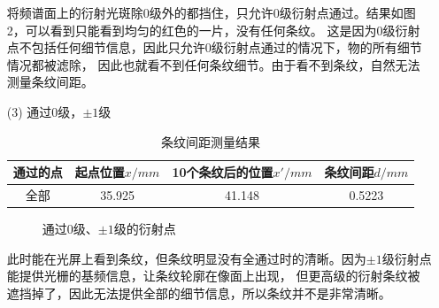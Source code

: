 \documentclass{article}
\begin{document}
\begin{enumerate}
        将频谱面上的衍射光斑除0级外的都挡住，只允许0级衍射点通过。结果如图2，可以看到只能看到均匀的红色的一片，没有任何条纹。
        这是因为0级衍射点不包括任何细节信息，因此只允许0级衍射点通过的情况下，物的所有细节情况都被滤除，
        因此也就看不到任何条纹细节。由于看不到条纹，自然无法测量条纹间距。

        \item [(3)] 通过0级，$\pm 1$级 \\
        \begin{table}[htb]
            \centering
            \begin{tabular}{|c|c|c|c|}
                \hline
                通过的点 & 起点位置$x/mm$ & 10个条纹后的位置$x'/mm$ & 条纹间距$d/mm$ \\
                \hline
                全部 & 35.925 & 41.148 & 0.5223 \\
                \hline
            \end{tabular}
            \caption{条纹间距测量结果}
        \end{table}
        \begin{figure}[htb]
            \centering
            \caption{通过0级、$\pm 1$级的衍射点}
        \end{figure}

        此时能在光屏上看到条纹，但条纹明显没有全通过时的清晰。因为$\pm 1$级衍射点能提供光栅的基频信息，让条纹轮廓在像面上出现，
        但更高级的衍射条纹被遮挡掉了，因此无法提供全部的细节信息，所以条纹并不是非常清晰。


\end{enumerate}
\end{document}
